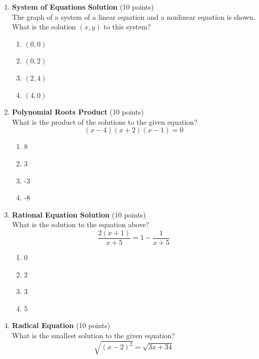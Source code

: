 \begin{enumerate}
  \newpage

  
  \item \textbf{System of Equations Solution} (10 points)\\
  The graph of a system of a linear equation and a nonlinear equation is shown. What is the solution $(x, y)$ to this system?
  \begin{enumerate}[label=(\Alph*)]
    \item $(0,0)$
    \item $(0,2)$
    \item $(2,4)$
    \item $(4,0)$
  \end{enumerate}
  \begin{subanswer}
  \end{subanswer}

  \item \textbf{Polynomial Roots Product} (10 points)\\
  What is the product of the solutions to the given equation?
  \[
  (x-4)(x+2)(x-1)=0
  \]
  \begin{enumerate}[label=(\Alph*)]
    \item 8
    \item 3
    \item -3
    \item -8
  \end{enumerate}
  \begin{subanswer}
  \end{subanswer}

  \item \textbf{Rational Equation Solution} (10 points)\\
  What is the solution to the equation above?
  \[
  \frac{2(x+1)}{x+5}=1-\frac{1}{x+5}
  \]
  \begin{enumerate}[label=(\Alph*)]
    \item 0
    \item 2
    \item 3
    \item 5
  \end{enumerate}
  \begin{subanswer}
  \end{subanswer}

  \item \textbf{Radical Equation} (10 points)\\
  What is the smallest solution to the given equation?
  \[
  \sqrt{(x-2)^{2}}=\sqrt{3 x+34}
  \]
  \begin{subanswer}
  \end{subanswer}
\end{enumerate}


